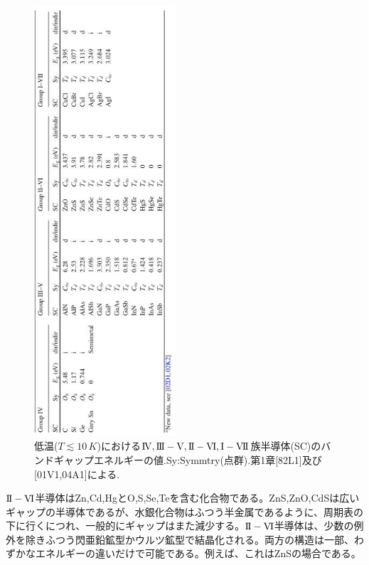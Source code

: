 \documentclass[11pt,a4j,uplatex]{jsarticle}
\begin{document}
\renewcommand{\figurename}{表}%
\setcounter{figure}{1}
\begin{figure}[htb]
  \centering
  \includegraphics[clip,height=16cm]{8_2.JPG}
  \caption{低温($T\lesssim10\,K$)における$\mathrm{I\hspace{-1pt}V},\mathrm{I\hspace{-1pt}I\hspace{-1pt}I-V},\mathrm{I\hspace{-1pt}I-V\hspace{-1pt}I},\mathrm{I-V\hspace{-1pt}I\hspace{-1pt}I}$族半導体(SC)のバンドギャップエネルギーの値.Sy:Symmtry(点群).第1章[82L1]及び[01V1,04A1]による.}
  \label{table8.2}
\end{figure}

$\mathrm{I\hspace{-1pt}I-V\hspace{-1pt}I}$半導体はZn,Cd,HgとO,S,Se,Teを含む化合物である。ZnS,ZnO,CdSは広いギャップの半導体であるが、水銀化合物はふつう半金属であるように、周期表の下に行くにつれ、一般的にギャップはまた減少する。$\mathrm{I\hspace{-1pt}I-V\hspace{-1pt}I}$半導体は、少数の例外を除きふつう閃亜鉛鉱型かウルツ鉱型で結晶化される。両方の構造は一部、わずかなエネルギーの違いだけで可能である。例えば、これはZnSの場合である。
\end{document}
